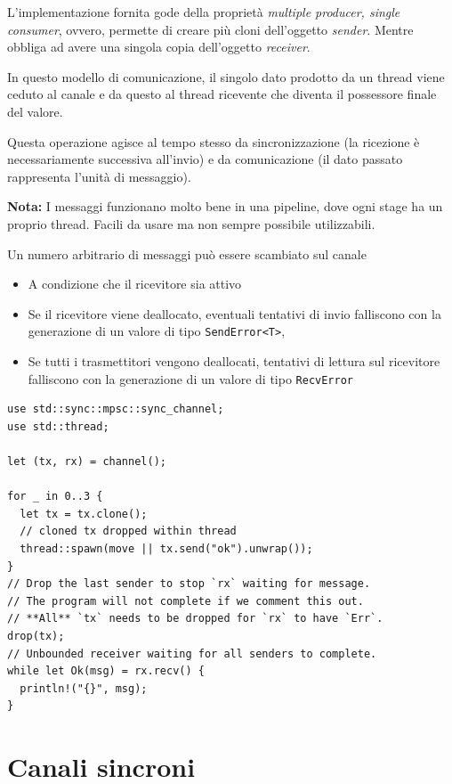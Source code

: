 L'implementazione fornita gode della proprietà \textit{multiple producer, single consumer},
ovvero, permette di creare più cloni dell'oggetto \textit{sender}.
Mentre obbliga ad avere una singola copia dell'oggetto \textit{receiver}.


In questo modello di comunicazione, il singolo dato prodotto da un thread viene
ceduto al canale e da questo al thread ricevente che diventa il possessore
finale del valore.

Questa operazione agisce al tempo stesso da sincronizzazione (la ricezione è
necessariamente successiva all'invio) e da comunicazione (il dato passato
rappresenta l'unità di messaggio).


\begin{tcolorbox}
  \textbf{Nota:} I messaggi funzionano molto bene in una pipeline, dove ogni stage ha un proprio thread. Facili da usare ma non sempre possibile utilizzabili.
\end{tcolorbox}

Un numero arbitrario di messaggi può essere scambiato sul canale

\begin{itemize}
  \item A condizione che il ricevitore sia attivo
  \item Se il ricevitore viene deallocato, eventuali tentativi di invio falliscono con la generazione di un valore di tipo \verb|SendError<T>|,
  \item Se tutti i trasmettitori vengono deallocati, tentativi di lettura sul ricevitore falliscono con la
        generazione di un valore di tipo \verb|RecvError|
\end{itemize}




\begin{verbatim}
use std::sync::mpsc::sync_channel;
use std::thread;

let (tx, rx) = channel();

for _ in 0..3 {
  let tx = tx.clone();
  // cloned tx dropped within thread
  thread::spawn(move || tx.send("ok").unwrap());
}
// Drop the last sender to stop `rx` waiting for message.
// The program will not complete if we comment this out.
// **All** `tx` needs to be dropped for `rx` to have `Err`.
drop(tx);
// Unbounded receiver waiting for all senders to complete.
while let Ok(msg) = rx.recv() {
  println!("{}", msg);
}
\end{verbatim}

\section{Canali sincroni}

